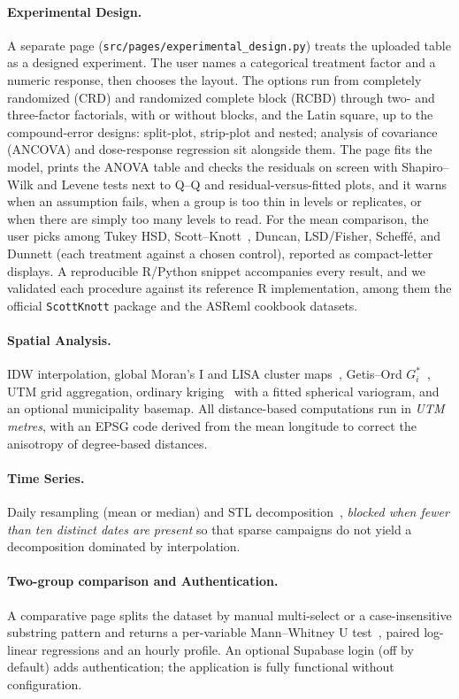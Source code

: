 \documentclass[a4paper,fleqn]{cas-dc}
\begin{document}
\paragraph{Experimental Design.} A separate page (\texttt{src/pages/experimental\_design.py}) treats the uploaded table as a designed experiment. The user names a categorical treatment factor and a numeric response, then chooses the layout. The options run from completely randomized (CRD) and randomized complete block (RCBD) through two- and three-factor factorials, with or without blocks, and the Latin square, up to the compound-error designs: split-plot, strip-plot and nested; analysis of covariance (ANCOVA) and dose-response regression sit alongside them. The page fits the model, prints the ANOVA table and checks the residuals on screen with Shapiro--Wilk and Levene tests next to Q--Q and residual-versus-fitted plots, and it warns when an assumption fails, when a group is too thin in levels or replicates, or when there are simply too many levels to read. For the mean comparison, the user picks among Tukey HSD, Scott--Knott~\cite{ScottKnott1974}, Duncan, LSD/Fisher, Scheff\'e, and Dunnett (each treatment against a chosen control), reported as compact-letter displays. A reproducible R/Python snippet accompanies every result, and we validated each procedure against its reference R implementation, among them the official \texttt{ScottKnott} package and the ASReml cookbook datasets.

\paragraph{Spatial Analysis.} IDW interpolation, global Moran's I and LISA cluster maps~\cite{Anselin1995}, Getis--Ord $G_i^*$~\cite{Getis1992}, UTM grid aggregation, ordinary kriging~\cite{Cressie1993} with a fitted spherical variogram, and an optional municipality basemap. All distance-based computations run in \emph{UTM metres}, with an EPSG code derived from the mean longitude to correct the anisotropy of degree-based distances.

\paragraph{Time Series.} Daily resampling (mean or median) and STL decomposition~\cite{Cleveland1990STL}, \emph{blocked when fewer than ten distinct dates are present} so that sparse campaigns do not yield a decomposition dominated by interpolation.

\paragraph{Two-group comparison and Authentication.} A comparative page splits the dataset by manual multi-select or a case-insensitive substring pattern and returns a per-variable Mann--Whitney U test~\cite{Mann1947}, paired log-linear regressions and an hourly profile. An optional Supabase login (off by default) adds authentication; the application is fully functional without configuration.
\end{document}
